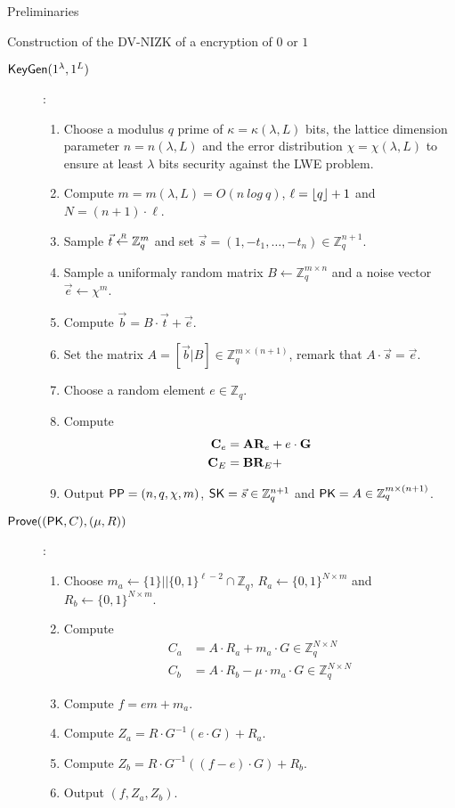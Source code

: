 \begin{section}{Preliminaries}
\begin{subsection}{Construction of the DV-NIZK of a encryption of $0$ or $1$}
    \begin{description}
    \item[${\mathsf{KeyGen}}(1^\lambda, 1^L)$]:
      \begin{enumerate}
      \item Choose a modulus $q$ prime of $\kappa = \kappa(\lambda, L)$ bits, the lattice dimension parameter $n = n(\lambda, L)$ and the error distribution $\chi = \chi(\lambda, L)$ to ensure at least $\lambda$ bits security against the LWE problem.
      \item Compute $m = m(\lambda, L) = O(n~log~q)$, $\ell = \lfloor q\rfloor+1$ and $N = (n+1) \cdot \ell$.
      \item Sample $\vec{t} \stackrel{{\scriptscriptstyle \mkern4mu R}}{\gets} \mathbb{Z}_q^m$ and set $\vec{s} = (1, -t_1, \dots, -t_n) \in \mathbb{Z}_q^{n+1}$.
      \item Sample a uniformaly random matrix $B \gets \mathbb{Z}_q^{m \times n}$ and a noise vector $\vec{e} \gets \chi^m$.
      \item Compute $\vec{b} = B \cdot \vec{t} + \vec{e}$.
      \item Set the matrix $A = [\vec{b}|B] \in \mathbb{Z}_q^{m \times (n+1)}$, remark that $A \cdot \vec{s} = \vec{e}$.
      \item Choose a random element $e \in \mathbb{Z}_{q}$.
      \item Compute
        \begin{align*}
          \mathbf{C}_e &= \mathbf{A} \mathbf{R}_e + e \cdot \mathbf{G}\\
          \mathbf{C}_E &= \mathbf{B} \mathbf{R}_E + 
        \end{align*}
      \item Output ${\mathsf{PP}} = (n, q, \chi, m)$, $\mathsf{SK} = \vec{s} \in \mathbb{Z}_q^{n+1}$ and $\mathsf{PK} = A \in \mathbb{Z}_q^{m \times (n+1)}$.
      \end{enumerate}
    \item[${\mathsf{Prove}}((\mathsf{PK}, C), (\mu, R))$]:
      \begin{enumerate}
      \item Choose $m_a \gets \{1\}||\{0,1\}^{\ell-2} \cap \mathbb{Z}_q$, $R_a \gets \{0,1\}^{N \times m}$ and $R_b \gets \{0,1\}^{N \times m}$.
      \item Compute
        \begin{align*}
          C_a &= A\cdot R_a + m_a \cdot G \in \mathbb{Z}_q^{N \times N}\\
          C_b &= A\cdot R_b - \mu \cdot m_a \cdot G \in \mathbb{Z}_q^{N \times N}          
        \end{align*}
      \item Compute $f = em +m_a$.
      \item Compute $Z_a = R \cdot G^{-1}(e \cdot G) + R_a$.
      \item Compute $Z_b = R \cdot G^{-1}((f-e) \cdot G) + R_b$.
      \item Output $(f, Z_a, Z_b)$.
      \end{enumerate}
      

\end{description}
\end{subsection}
\end{section}
